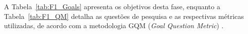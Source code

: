 A Tabela~\ref{tab:F1_Goals} apresenta os objetivos desta fase, enquanto a Tabela~\ref{tab:F1_QM} detalha as questões de pesquisa e as respectivas métricas utilizadas, de acordo com a metodologia GQM (\textit{Goal Question Metric}) \citep{basili:1994}.




